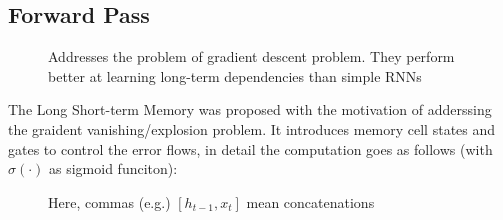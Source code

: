 \documentclass[11pt]{article}
\begin{document}
\subsection{Forward Pass}

\begin{figure}[H]
    \centering
    \caption*{Addresses the problem of gradient descent problem. They perform better at learning long-term dependencies than simple RNNs}
\end{figure}

The Long Short-term Memory was proposed with the motivation of adderssing the graident vanishing/explosion problem. It introduces memory cell states and gates to control the error flows, in detail the computation goes as follows (with $\sigma(\cdot)$ as sigmoid funciton):

\begin{figure}[H]
    \centering
    \caption*{Here, commas (e.g.) $[h_{t-1},x_t]$ mean concatenations}
\end{figure}
\end{document}
